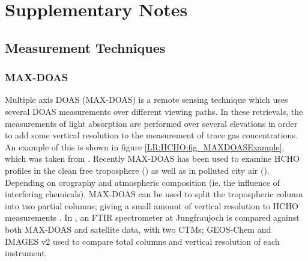 
\chapter{Supplementary Notes}
  \label{SuppNotes}

\section{Measurement Techniques}
  \subsection{MAX-DOAS}
    Multiple axis DOAS (MAX-DOAS) is a remote sensing technique which uses several DOAS measurements over different viewing paths.
    In these retrievals, the measurements of light absorption are performed over several elevations in order to add some vertical resolution to the measurement of trace gas concentrations.
    An example of this is shown in figure \ref{LR:HCHO:fig_MAXDOASExample}, which was taken from \textcite{Lee2015}.
    Recently MAX-DOAS has been used to examine HCHO profiles in the clean free troposphere (\textcite{Franco2015, Schreier2016}) as well as in polluted city air (\textcite{Lee2015}).
    Depending on orography and atmospheric composition (ie. the influence of interfering chemicals), MAX-DOAS can be used to split the tropospheric column into two partial columns; giving a small amount of vertical resolution to HCHO measurements \parencite[eg.]{Franco2015, Lee2015}.
    In \textcite{Franco2015}, an FTIR spectrometer at Jungfraujoch is compared against both MAX-DOAS and satellite data, with two CTMs; GEOS-Chem and IMAGES v2 used to compare total columns and vertical resolution of each instrument.
    
